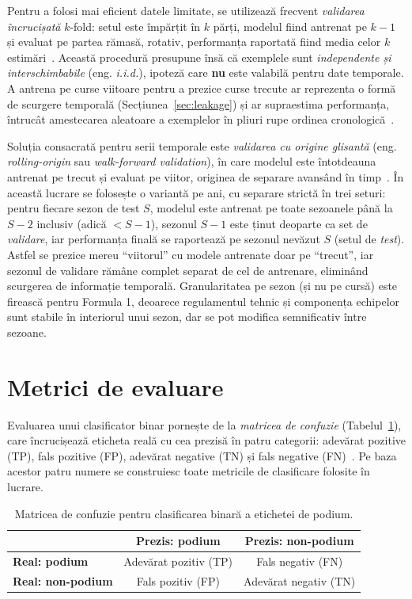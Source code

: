 \documentclass[12pt,a4paper]{report}
\begin{document}
Pentru a folosi mai eficient datele limitate, se utilizează frecvent \emph{validarea încrucișată}
$k$-fold: setul este împărțit în $k$ părți, modelul fiind antrenat pe $k-1$ și evaluat pe partea
rămasă, rotativ, performanța raportată fiind media celor $k$ estimări~\cite{kohavi1995study}.
Această procedură presupune însă că exemplele sunt \emph{independente și interschimbabile} (eng.
\emph{i.i.d.}), ipoteză care \textbf{nu} este valabilă pentru date temporale. A antrena pe curse
viitoare pentru a prezice curse trecute ar reprezenta o formă de scurgere temporală
(Secțiunea~\ref{sec:leakage}) și ar supraestima performanța, întrucât amestecarea aleatoare a
exemplelor în pliuri rupe ordinea cronologică~\cite{bergmeir2012use}.

Soluția consacrată pentru serii temporale este \emph{validarea cu origine glisantă} (eng.
\emph{rolling-origin} sau \emph{walk-forward validation}), în care modelul este întotdeauna
antrenat pe trecut și evaluat pe viitor, originea de separare avansând în timp~\cite{bergmeir2012use}.
În această lucrare se folosește o variantă pe ani, cu separare strictă în trei seturi: pentru
fiecare sezon de test $S$, modelul este antrenat pe toate sezoanele până la $S-2$ inclusiv (adică
$< S-1$), sezonul $S-1$ este ținut deoparte ca set de \emph{validare}, iar performanța finală se
raportează pe sezonul nevăzut $S$ (setul de \emph{test}). Astfel se prezice mereu ``viitorul'' cu
modele antrenate doar pe ``trecut'', iar sezonul de validare rămâne complet separat de cel de
antrenare, eliminând scurgerea de informație temporală. Granularitatea pe sezon (și nu pe cursă)
este firească pentru Formula 1, deoarece regulamentul tehnic și componența echipelor sunt stabile
în interiorul unui sezon, dar se pot modifica semnificativ între sezoane.

\section{Metrici de evaluare}
\label{sec:metrici}

Evaluarea unui clasificator binar pornește de la \emph{matricea de confuzie}
(Tabelul~\ref{tab:confuzie}), care încrucișează eticheta reală cu cea prezisă în patru categorii:
adevărat pozitive (TP), fals pozitive (FP), adevărat negative (TN) și fals negative
(FN)~\cite{fawcett2006roc}. Pe baza acestor patru numere se construiesc toate metricile de
clasificare folosite în lucrare.

\begin{table}[htbp]
  \centering
  \begin{tabular}{l c c}
    \toprule
     & \textbf{Prezis: podium} & \textbf{Prezis: non-podium} \\
    \midrule
    \textbf{Real: podium}     & Adevărat pozitiv (TP) & Fals negativ (FN) \\
    \textbf{Real: non-podium} & Fals pozitiv (FP)     & Adevărat negativ (TN) \\
    \bottomrule
  \end{tabular}
  \caption{Matricea de confuzie pentru clasificarea binară a etichetei de podium.}
  \label{tab:confuzie}
\end{table}
\end{document}
